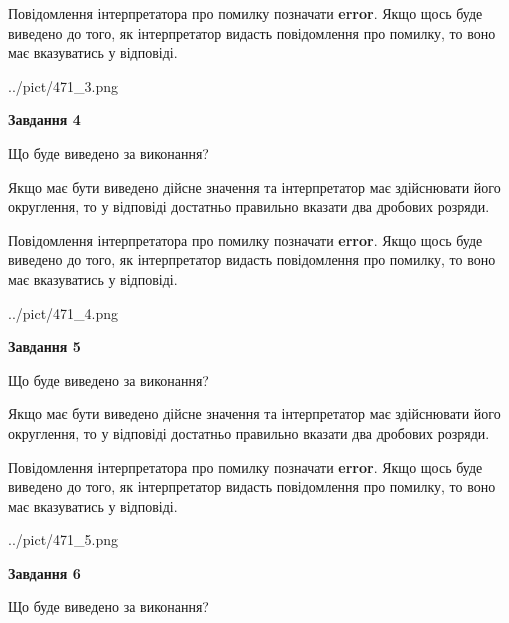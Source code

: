 \documentclass[12pt, ukrainian]{article}
\begin{document}
{\begin {Large}
Повідомлення інтерпретатора про помилку позначати \textbf{error}.
Якщо щось буде виведено до того, як інтерпретатор видасть повідомлення про помилку, 
то воно має вказуватись у відповіді. \par

\begin{center}
	{../pict/471_3.png}
\end{center}
\newpage

{\begin {center}\textbf{Завдання 4}\end {center}}\par
Що буде виведено за виконання? \par

Якщо має бути виведено дійсне значення та інтерпретатор має здійснювати його округлення, 
то у відповіді достатньо правильно вказати два дробових розряди.

Повідомлення інтерпретатора про помилку позначати \textbf{error}.
Якщо щось буде виведено до того, як інтерпретатор видасть повідомлення про помилку, 
то воно має вказуватись у відповіді. \par

\begin{center}
	{../pict/471_4.png}
\end{center}
\newpage

{\begin {center}\textbf{Завдання 5}\end {center}}\par
Що буде виведено за виконання? \par

Якщо має бути виведено дійсне значення та інтерпретатор має здійснювати його округлення, 
то у відповіді достатньо правильно вказати два дробових розряди.

Повідомлення інтерпретатора про помилку позначати \textbf{error}.
Якщо щось буде виведено до того, як інтерпретатор видасть повідомлення про помилку, 
то воно має вказуватись у відповіді. \par

\begin{center}
	{../pict/471_5.png}
\end{center}
\newpage

{\begin {center}\textbf{Завдання 6}\end {center}}\par
Що буде виведено за виконання? \par


\end{Large}}
\end{document}
